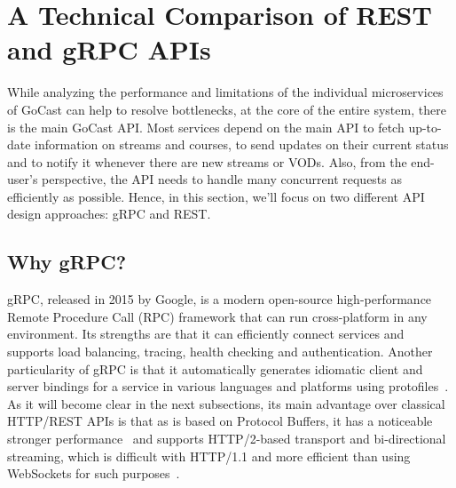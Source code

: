 


\section{A Technical Comparison of REST and gRPC APIs}

While analyzing the performance and limitations of the individual microservices of GoCast can help to resolve bottlenecks, at the core of the entire system, there is the main GoCast \ac{API}.
Most services depend on the main \ac{API} to fetch up-to-date information on streams and courses, to send updates on their current status and to notify it whenever there are new streams or \ac{VOD}s. Also, from the end-user's perspective, the \ac{API} needs to handle many concurrent requests as efficiently as possible. Hence, in this section, we'll focus on two different \ac{API} design approaches: \ac{gRPC} and \ac{REST}.

\subsection{Why gRPC?}

\ac{gRPC}, released in 2015 by Google, is a modern open-source high-performance Remote Procedure Call (RPC) framework that can run cross-platform in any environment. Its strengths are that it can efficiently connect services and supports load balancing, tracing, health checking and authentication.
Another particularity of \ac{gRPC} is that it automatically generates idiomatic client and server bindings for a service in various languages and platforms using protofiles~\parencite{grpc_vs_rest}.
As it will become clear in the next subsections, its main advantage over classical HTTP/\ac{REST} \ac{API}s is that as is based on Protocol Buffers, it has a noticeable stronger performance~\parencite{grpc_vs_rest_2} and supports HTTP/2-based transport and bi-directional streaming, which is difficult with HTTP/1.1 and more efficient than using WebSockets for such purposes~\parencite{grpc_dev}.

